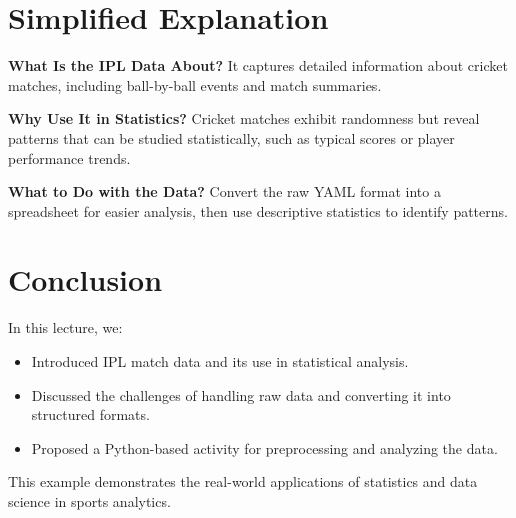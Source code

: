 \documentclass{article}
\begin{document}
\section*{Simplified Explanation}

\textbf{What Is the IPL Data About?}
It captures detailed information about cricket matches, including ball-by-ball events and match summaries.

\textbf{Why Use It in Statistics?}
Cricket matches exhibit randomness but reveal patterns that can be studied statistically, such as typical scores or player performance trends.

\textbf{What to Do with the Data?}
Convert the raw YAML format into a spreadsheet for easier analysis, then use descriptive statistics to identify patterns.

\section*{Conclusion}

In this lecture, we:
\begin{itemize}
  \item Introduced IPL match data and its use in statistical analysis.
  \item Discussed the challenges of handling raw data and converting it into structured formats.
  \item Proposed a Python-based activity for preprocessing and analyzing the data.
\end{itemize}

This example demonstrates the real-world applications of statistics and data science in sports analytics.
\end{document}
